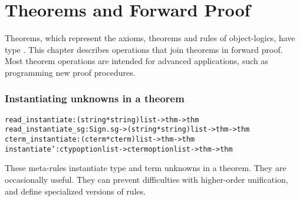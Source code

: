
\chapter{Theorems and Forward Proof}

Theorems, which represent the axioms, theorems and rules of
object-logics, have type .  This chapter describes
operations that join theorems in forward proof.  Most theorem
operations are intended for advanced applications, such as programming
new proof procedures.


\subsection{Instantiating unknowns in a theorem} \label{sec:instantiate}
\begin{alltt}\footnotesize
read_instantiate    :                (string*string) list -> thm -> thm
read_instantiate_sg :     Sign.sg -> (string*string) list -> thm -> thm
cterm_instantiate   :                  (cterm*cterm) list -> thm -> thm
instantiate'      : ctyp option list -> cterm option list -> thm -> thm
\end{alltt}
These meta-rules instantiate type and term unknowns in a theorem.  They are
occasionally useful.  They can prevent difficulties with higher-order
unification, and define specialized versions of rules.
